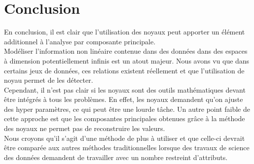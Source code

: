\section{Conclusion}

En conclusion, il est clair que l'utilisation des noyaux peut apporter un élément additionnel à l'analyse par composante principale.\\

Modéliser l'information non linéaire contenue dans des données dans des espaces à dimension potentiellement infinis est un atout majeur.
Nous avons vu que dans certains jeux de données, ces relations existent réellement et que l'utilisation de noyau permet de les détecter.\\

Cependant, il n'est pas clair si les noyaux sont des outils mathématiques devant être intégrés à tous les problèmes. 
En effet, les noyaux demandent qu'on ajuste des hyper paramètres, ce qui peut être une lourde tâche. Un autre point faible de 
cette approche est que les composantes principales obtenues grâce à la méthode des noyaux ne permet pas de reconstruire les 
valeurs. \\

Nous croyons qu'il s'agit d'une méthode de plus à utiliser et que celle-ci devrait être comparée aux autres méthodes
traditionnelles lorsque des travaux de science des données demandent de travailler avec un nombre restreint d'attributs.